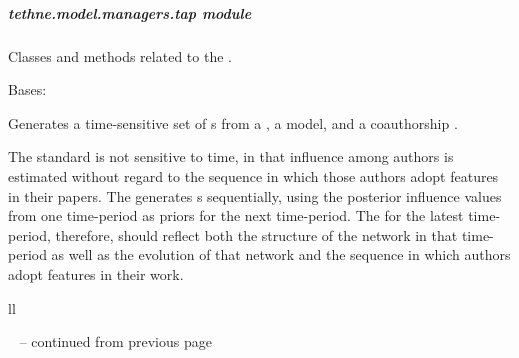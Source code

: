\documentclass[letterpaper,10pt,english]{sphinxmanual}
\begin{document}
\subparagraph{tethne.model.managers.tap module}
\label{tethne.model.managers.tap:tethne-model-managers-tap-module}\label{tethne.model.managers.tap::doc}\label{tethne.model.managers.tap:module-tethne.model.managers.tap}
Classes and methods related to the {\hyperref[tethne.model.managers.tap:tethne.model.managers.tap.TAPModelManager]{}}.

\begin{fulllineitems}
\label{tethne.model.managers.tap:tethne.model.managers.tap.TAPModelManager}
Bases: {\hyperref[tethne.model.managers:tethne.model.managers.SocialModelManager]{}}

Generates a time-sensitive set of {\hyperref[tethne.model.social.tapmodel:tethne.model.social.tapmodel.TAPModel]{}}s from a 
{\hyperref[tethne.classes.corpus:tethne.classes.corpus.Corpus]{}}, a {\hyperref[tethne.model.corpus:module-tethne.model.corpus]{}} model, and a coauthorship 
{\hyperref[tethne.classes.graphcollection:tethne.classes.graphcollection.GraphCollection]{}}.

The standard {\hyperref[tethne.model.social.tapmodel:tethne.model.social.tapmodel.TAPModel]{}} is not sensitive to time, in that influence
among authors is estimated without regard to the sequence in which those
authors adopt features in their papers. The {\hyperref[tethne.model.managers.tap:tethne.model.managers.tap.TAPModelManager]{}} 
generates {\hyperref[tethne.model.social.tapmodel:tethne.model.social.tapmodel.TAPModel]{}}s sequentially, using the posterior influence
values from one time-period as priors for the next time-period. The
{\hyperref[tethne.model.social.tapmodel:tethne.model.social.tapmodel.TAPModel]{}} for the latest time-period, therefore, should reflect
both the structure of the network in that time-period as well as the
evolution of that network and the sequence in which authors adopt features
in their work.

\begin{longtable}{ll}
\hline
\endfirsthead

%
{{\textsf{\tablename\ \thetable{} -- continued from previous page}}} \\
\hline
\endhead


\end{longtable}
\end{fulllineitems}
\end{document}
